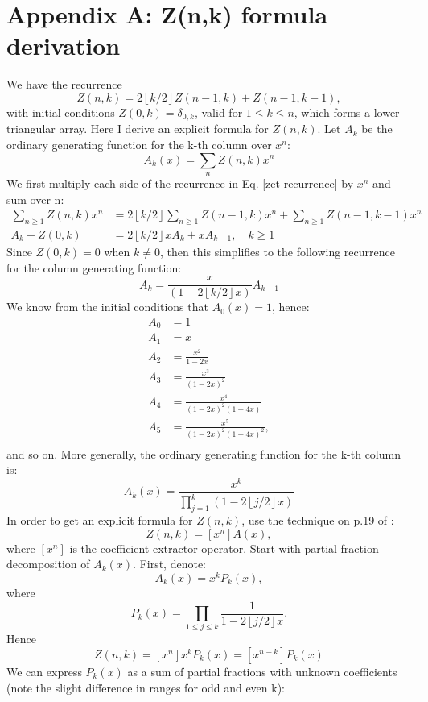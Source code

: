 \documentclass{article}
\newcommand{\floor}[1]{\left\lfloor #1 \right\rfloor}
\begin{document}
\section*{Appendix A: Z(n,k) formula derivation}
We have the recurrence
\begin{equation}\label{zet-recurrence}
Z(n,k) = 2\floor{k/2} Z(n-1,k)+Z(n-1,k-1),
\end{equation}
with initial conditions $Z(0,k) = \delta_{0,k}$, valid for $1 \leq k \leq n$, which forms a lower triangular array. 
Here I derive an explicit formula for $Z(n,k)$. Let $A_k$ be the ordinary generating function for the k-th column over $x^n$:
$$
A_k(x) = \sum_{n} Z(n,k) x^n
$$
We first multiply each side of the recurrence in Eq. \ref{zet-recurrence} by $x^n$ and sum over n:
$$
\begin{aligned}
\sum_{n \geq 1} Z(n,k)x^n &= 2\floor{k/2}\sum_{n \geq 1}Z(n-1,k)x^n + \sum_{n \geq 1} Z(n-1,k-1) x^n \\
A_k -Z(0,k)&=2\floor{k/2}x A_k+x A_{k-1}, \quad k \geq 1
\end{aligned}
$$
Since $Z(0,k) = 0$ when $k \neq 0$, then this simplifies to the following recurrence for the column generating function:
$$
A_k = \frac{x}{(1-2\floor{k/2}x)} A_{k-1}
$$
We know from the initial conditions that $A_0(x) = 1$, hence:
$$
\begin{aligned}
    A_0 &= 1 \\
    A_1 &= x \\
    A_2 &= \frac{x^2}{1-2x} \\
    A_3 &= \frac{x^3}{(1-2x)^2} \\
    A_4 &= \frac{x^4}{(1-2x)^2 (1-4x)} \\
    A_5 &= \frac{x^5}{(1-2x)^2 (1-4x)^2}, \\
\end{aligned}
$$
and so on. More generally, the ordinary generating function for the k-th column is:
\begin{equation}
A_k(x) = \frac{x^k}{\prod_{j=1}^k(1-2\floor{j/2}x)}
\end{equation}
In order to get an explicit formula for $Z(n,k)$, use the technique on p.19 of \cite{wilfGeneratingfunctionologyThirdEdition2005}:
$$
Z(n,k) = [x^n]A(x),
$$
where $[x^n]$ is the coefficient extractor operator. Start with partial fraction decomposition of $A_k(x)$. First, denote:
$$
A_k(x) = x^kP_k(x),
$$
where
$$
P_k(x) = \prod_{1 \leq j \leq k}\frac{1}{1-2\floor{j/2}x}.
$$
Hence
\begin{equation}\label{znk-coef}
Z(n,k) = [x^n]x^kP_k(x) = [x^{n-k}]P_k(x)
\end{equation}
We can express $P_k(x)$ as a sum of partial fractions with unknown coefficients (note the slight difference in ranges for odd and even k):
\end{document}
